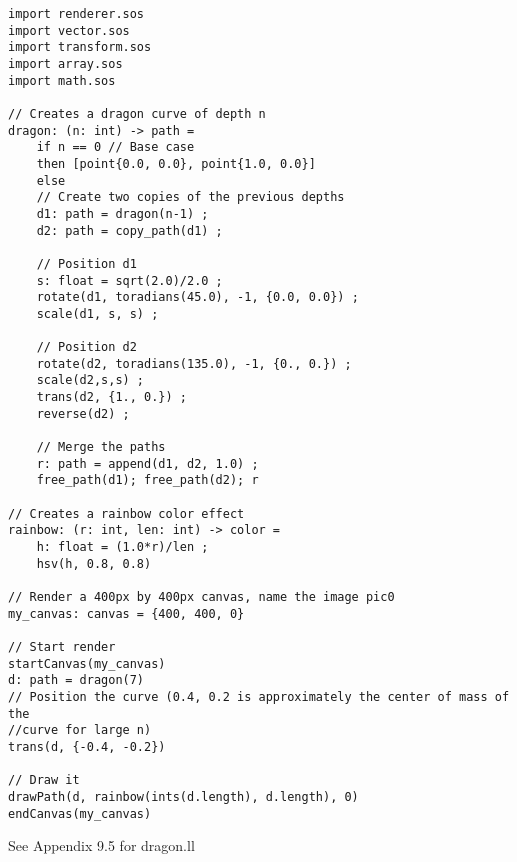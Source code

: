 \documentclass[main.tex]{subfiles}
\begin{document}
\begin{lstlisting}
import renderer.sos
import vector.sos
import transform.sos
import array.sos
import math.sos

// Creates a dragon curve of depth n
dragon: (n: int) -> path =
    if n == 0 // Base case
    then [point{0.0, 0.0}, point{1.0, 0.0}]
    else
    // Create two copies of the previous depths
    d1: path = dragon(n-1) ;
    d2: path = copy_path(d1) ;

    // Position d1
    s: float = sqrt(2.0)/2.0 ;
    rotate(d1, toradians(45.0), -1, {0.0, 0.0}) ;
    scale(d1, s, s) ;

    // Position d2
    rotate(d2, toradians(135.0), -1, {0., 0.}) ;
    scale(d2,s,s) ;
    trans(d2, {1., 0.}) ;
    reverse(d2) ;

    // Merge the paths
    r: path = append(d1, d2, 1.0) ;
    free_path(d1); free_path(d2); r

// Creates a rainbow color effect
rainbow: (r: int, len: int) -> color =
    h: float = (1.0*r)/len ;
    hsv(h, 0.8, 0.8)

// Render a 400px by 400px canvas, name the image pic0
my_canvas: canvas = {400, 400, 0}

// Start render
startCanvas(my_canvas)
d: path = dragon(7)
// Position the curve (0.4, 0.2 is approximately the center of mass of the 
//curve for large n)
trans(d, {-0.4, -0.2})

// Draw it
drawPath(d, rainbow(ints(d.length), d.length), 0)
endCanvas(my_canvas)
\end{lstlisting}

See Appendix 9.5 for dragon.ll
\end{document}
